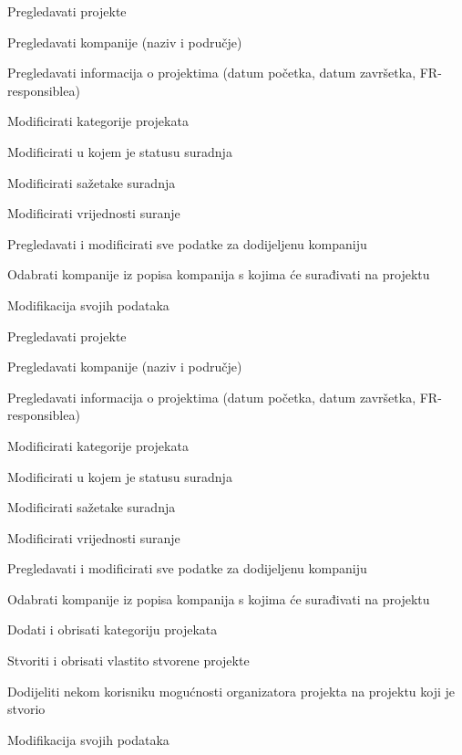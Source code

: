 \begin{packed_enum}
\begin{packed_enum}
				\end{packed_enum}

				\item  {}

				\begin{packed_enum}

					\item Pregledavati projekte
					\item Pregledavati kompanije (naziv i područje)
					\item Pregledavati informacija o projektima (datum početka, datum završetka, FR-responsiblea)
					\item Modificirati kategorije projekata
					\item Modificirati u kojem je statusu suradnja
					\item Modificirati sažetake suradnja
					\item Modificirati vrijednosti suranje
					\item Pregledavati i modificirati sve podatke za dodijeljenu kompaniju
					\item Odabrati kompanije iz popisa kompanija s kojima će surađivati na projektu
					\item Modifikacija svojih podataka

				\end{packed_enum}

				\item  {}

				\begin{packed_enum}

					\item Pregledavati projekte
					\item Pregledavati kompanije (naziv i područje)
					\item Pregledavati informacija o projektima (datum početka, datum završetka, FR-responsiblea)
					\item Modificirati kategorije projekata
					\item Modificirati u kojem je statusu suradnja
					\item Modificirati sažetake suradnja
					\item Modificirati vrijednosti suranje
					\item Pregledavati i modificirati sve podatke za dodijeljenu kompaniju
					\item Odabrati kompanije iz popisa kompanija s kojima će surađivati na projektu
					\item Dodati i obrisati kategoriju projekata
					\item Stvoriti i obrisati vlastito stvorene projekte
					\item Dodijeliti nekom korisniku mogućnosti organizatora projekta na projektu koji je stvorio
					\item Modifikacija svojih podataka


\end{packed_enum}
\end{packed_enum}
